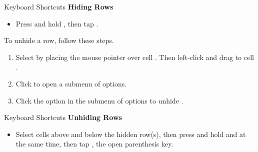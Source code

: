 \begin{center}
	\begin{shtcutbox}{Keyboard Shortcuts}
		\textbf{Hiding Rows}
		\\
		\begin{itemize}
			\setlength{\itemsep}{0pt}
			\setlength{\parskip}{0pt}
			\setlength{\parsep}{0pt}
			
			\item Press and hold , then tap .
			
		\end{itemize}
	\end{shtcutbox}
\end{center}

To unhide a row, follow these steps.

\begin{enumbox}
	\begin{enumerate}
		\item Select  by placing the mouse pointer over cell . Then left-click and drag to cell .
		\item Click  to open a submenu of options.
		\item Click the  option in the submenu of options to unhide .
	\end{enumerate}
\end{enumbox}
	
\begin{center}
	\begin{shtcutbox}{Keyboard Shortcuts}
		\textbf{Unhiding Rows}
		\\
		\begin{itemize}
			\setlength{\itemsep}{0pt}
			\setlength{\parskip}{0pt}
			\setlength{\parsep}{0pt}
			
			\item Select cells above and below the hidden row(s), then press and hold  and  at the same time, then tap \fmtKeystroke{(}, the open parenthesis key.
			
		\end{itemize}
	\end{shtcutbox}
\end{center}


